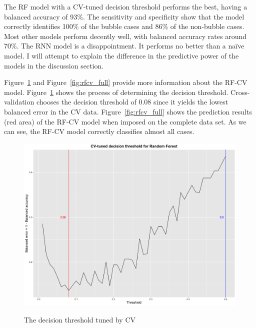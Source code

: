 \documentclass[12pt, man, a4paper, floatsintext]{apa7}
\begin{document}
The RF model with a CV-tuned decision threshold performs the best, having a balanced accuracy of 93\%. The sensitivity and specificity show that the model correctly identifies 100\% of the bubble cases and 86\% of the non-bubble cases. Most other models perform decently well, with balanced accuracy rates around 70\%. The RNN model is a disappointment. It performs no better than a naïve model. I will attempt to explain the difference in the predictive power of the models in the discussion section.

Figure~\ref{fig:cv_threshold} and Figure~\ref{fig:rfcv_full} provide more information about the RF-CV model. Figure~\ref{fig:cv_threshold} shows the process of determining the decision threshold. Cross-validation chooses the decision threshold of 0.08 since it yields the lowest balanced error in the CV data. Figure~\ref{fig:rfcv_full} shows the prediction results (red area) of the RF-CV model when imposed on the complete data set. As we can see, the RF-CV model correctly classifies almost all cases. 


\begin{figure}
    \centering
    \caption{The decision threshold tuned by CV}
    \includegraphics[width=15cm]{cv_threshold.png}
    \label{fig:cv_threshold}
\end{figure}
\end{document}

